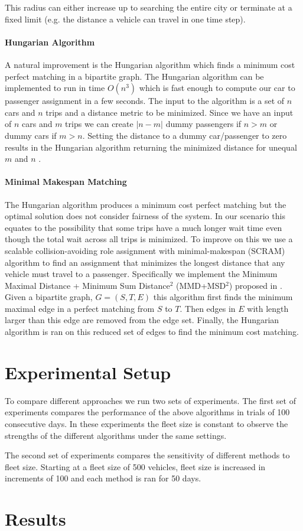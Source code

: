 \documentclass[letterpaper]{article}
\begin{document}
This radius can either increase up to searching the entire city or terminate at a fixed limit (e.g. the distance a vehicle can travel in one time step).

\paragraph{Hungarian Algorithm}
A natural improvement is the Hungarian algorithm \cite{kuhn1955hungarian} which finds a minimum cost perfect matching in a bipartite graph. The Hungarian algorithm can be implemented to run in time $O(n^3)$ which is fast enough to compute our car to passenger assignment in a few seconds. The input to the algorithm is a set of $n$ cars and $n$ trips and a distance metric to be minimized. Since we have an input of $n$ cars and $m$ trips we can create $|n-m|$ dummy passengers if $n > m$ or dummy cars if $m > n$. Setting the distance to a dummy car/passenger to zero results in the Hungarian algorithm returning the minimized distance for unequal $m$ and $n$ \cite{macalpine2015scram}.

\paragraph{Minimal Makespan Matching}
The Hungarian algorithm produces a minimum cost perfect matching but the optimal solution does not consider fairness of the system. In our scenario this equates to the possibility that some trips have a much longer wait time even though the total wait across all trips is minimized. To improve on this we use a scalable collision-avoiding role assignment with minimal-makespan (SCRAM) algorithm to find an assignment that minimizes the longest distance that any vehicle must travel to a passenger. Specifically we implement the Minimum Maximal Distance + Minimum Sum Distance$^2$ (MMD+MSD$^2$) proposed in \cite{macalpine2015scram}. Given a bipartite graph, $G = ({S,T},E)$  this algorithm first finds the minimum maximal edge in a perfect matching from $S$ to $T$. Then edges in $E$ with length larger than this edge are removed from the edge set. Finally, the Hungarian algorithm is ran on this reduced set of edges to find the minimum cost matching.  

\section{Experimental Setup}
To compare different approaches we run two sets of experiments. The first set of experiments compares the performance of the above algorithms in trials of 100 consecutive days. In these experiments the fleet size is constant to observe the strengths of the different algorithms under the same settings.


The second set of experiments compares the sensitivity of different methods to fleet size. Starting at a fleet size of 500 vehicles, fleet size is increased in increments of 100 and each method is ran for 50 days.

\section{Results}




\end{document}
